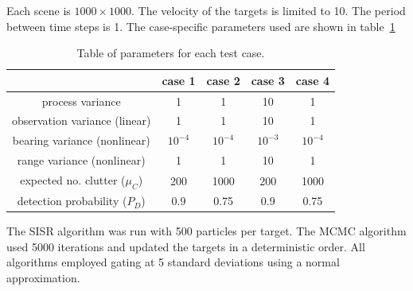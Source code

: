 Each scene is $1000 \times 1000$. The velocity of the targets is limited to 10. The period between time steps is 1. The case-specific parameters used are shown in table~\ref{tab:CaseParameters}

\begin{table}%
\begin{center}
\begin{tabular}{|c|c|c|c|c|}
\hline
 & case 1 & case 2 & case 3 & case 4 \\
\hline \hline
process variance & 1 & 1 & 10 & 1 \\
observation variance (linear) & 1 & 1 & 10 & 1 \\
bearing variance (nonlinear) & $10^{-4}$ & $10^{-4}$ & $10^{-3}$ & $10^{-4}$ \\
range variance (nonlinear) & 1 & 1 & 10 & 1 \\
expected no. clutter ($\mu_C$) & 200 & 1000 & 200 & 1000 \\
detection probability ($P_D$) & 0.9 & 0.75 & 0.9 & 0.75 \\
\hline
\end{tabular}
\end{center}
\caption{Table of parameters for each test case.}
\label{tab:CaseParameters}
\end{table}

The SISR algorithm was run with 500 particles per target. The MCMC algorithm used 5000 iterations and updated the targets in a deterministic order. All algorithms employed gating at 5 standard deviations using a normal approximation.